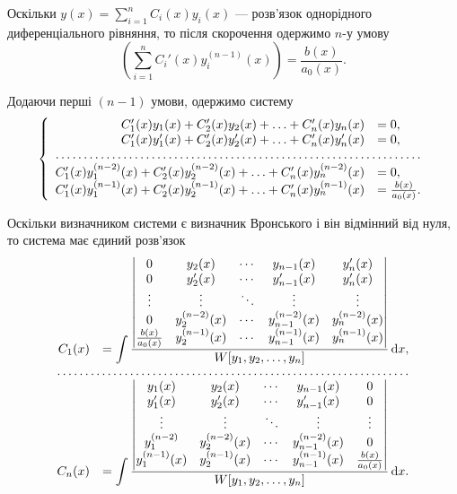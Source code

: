 Оскільки $y(x) = \sum_{i = 1}^n C_i(x) y_i(x)$ --- розв'язок однорідного диференціального рівняння, то після скорочення одержимо $n$-у умову
\begin{equation*}
	\left( \sum_{i = 1}^n C_i'(x) y_i^{(n - 1)}(x) \right) = \frac{b(x)}{a_0(x)}.
\end{equation*}

Додаючи перші $(n -1 )$ умови, одержимо систему
\begin{equation*}
	\left\{ \begin{array}{rl}
		C_1'(x) y_1(x) + C_2'(x) y_2(x) + \ldots + C_n'(x) y_n(x) &= 0, \\
		C_1'(x) y_1'(x) + C_2'(x) y_2'(x) + \ldots + C_n'(x) y_n'(x) &= 0, \\
		\hdotsfor{2} \\
		C_1'(x) y_1^{(n - 2)}(x) + C_2'(x) y_2^{(n - 2)}(x) + \ldots + C_n'(x) y_n^{(n - 2)}(x) &= 0, \\
		C_1'(x) y_1^{(n - 1)}(x) + C_2'(x) y_2^{(n - 1)}(x) + \ldots + C_n'(x) y_n^{(n - 1)}(x) &= \frac{b(x)}{a_0(x)}.
	\end{array} \right.
\end{equation*}
 
Оскільки визначником системи є визначник Вронського і він відмінний від нуля, то система має єдиний роз\-в'яз\-ок
\begin{equation*}
	\begin{array}{rl}
		C_1(x) &= \displaystyle\int \frac{\begin{vmatrix} 0 & y_2(x) & \cdots & y_{n - 1}(x) & y_n'(x) \\ 0 & y_2'(x) & \cdots & y_{n - 1}'(x) & y_n'(x) \\ \vdots & \vdots & \ddots & \vdots & \vdots \\ 0 & y_2^{(n - 2)}(x) & \cdots & y_{n - 1}^{(n - 2)}(x) & y_n^{(n - 2)}(x) \\ \frac{b(x)}{a_0(x)} & y_2^{(n - 1)}(x) & \cdots & y_{n - 1}^{(n - 1)}(x) & y_n^{(n - 1)}(x) \end{vmatrix}}{W[y_1, y_2, \ldots, y_n]} \diff x, \\
		\hdotsfor{2} \\
		C_n(x) &= \displaystyle\int \frac{\begin{vmatrix} y_1(x) & y_2(x) & \cdots & y_{n - 1}(x) & 0 \\ y_1'(x) & y_2'(x) & \cdots & y_{n - 1}'(x) & 0 \\ \vdots & \vdots & \ddots & \vdots & \vdots \\ y_1^{(n - 2)} & y_2^{(n - 2)}(x) & \cdots & y_{n - 1}^{(n - 2)}(x) & 0 \\ y_1^{(n - 1)}(x) & y_2^{(n - 1)}(x) & \cdots & y_{n - 1}^{(n - 1)}(x) & \frac{b(x)}{a_0(x)} \end{vmatrix}}{W[y_1, y_2, \ldots, y_n]} \diff x.
	\end{array}
\end{equation*}

